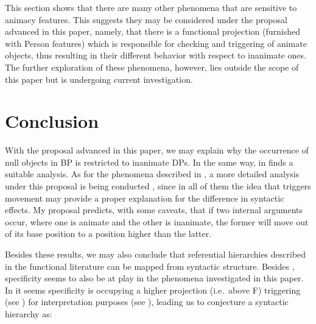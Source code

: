 \documentclass[output=paper]{langsci/langscibook}
\begin{document}
\ea\label{ex:27.47} 
    \z
\z
This section shows that there are many other phenomena that are sensitive to
animacy features. This suggests they may be considered under the proposal
advanced in this paper, namely, that there is a functional projection
(furnished with Person features) which is responsible for checking and
triggering  of animate objects, thus resulting in their different
behavior with respect to inanimate ones. The further exploration of these
phenomena, however, lies outside the scope of this paper but is undergoing
current investigation.

\section{Conclusion}

With the proposal advanced in this paper, we may explain why the occurrence of
null objects in \gls{BP} is restricted to inanimate
DPs. In the same way,  in  finds a suitable
analysis. As for the phenomena described in , a more
detailed analysis under this proposal is being conducted
\parencite{Cyrino2017}, since in all of them the idea that  triggers
movement may provide a proper explanation for the difference in syntactic
effects. My proposal predicts, with some caveats, that if two internal
arguments occur, where one is animate and the other is inanimate, the former
will move out of its base position to a position higher than the latter.

Besides these results, we may also conclude that referential hierarchies
described in the functional literature can be mapped from syntactic structure.
Besides , specificity seems to also be at play in the phenomena
investigated in this paper. In  it seems specificity is occupying
a higher projection (i.e.\ above F) triggering  (see
\citealt{IrimiaCyrino2015}) for interpretation purposes (see
\citealt{Lopez2012}), leading us to conjecture a syntactic hierarchy as:
\end{document}
